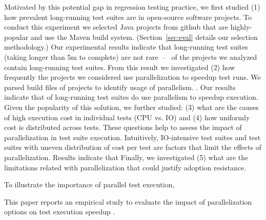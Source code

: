 Motivated by this potential gap in regression testing practice, we
first studied (1) how prevalent long-running test suites are in
open-source software projects.  To conduct this experiment we selected
\numSubjs{} Java projects from github that are highly-popular and use
the Maven build system.  (Section~\ref{sec:eval} details our selection
methodology.)  Our experimental results indicate that long-running
test suites (taking longer than 5m to complete) are not
rare~--~\numLongRunning{} of the projects we analyzed contain
long-running test suites.  From this result we investigated (2) how
frequently the projects we considered use parallelization to speedup
test runs.  We parsed build files of projects to identify usage of
parallelism. .  Our results indicate that
\percentParallelForLongRunning{} of long-running test suites do use
parallelism to speedup execution.  Given the popularity of this
solution, we further studied: (3) what are the causes of high
execution cost in individual tests (CPU vs. IO) and (4) how uniformly
cost is distributed across tests.  These questions help to assess the
impact of parallelization in test suite execution.  Intuitively,
IO-intensive test suites and test suites with uneven distribution of
cost per test are factors that limit the effects of parallelization.
Results indicate that   Finally, we investigated (5) what are
the limitations related with parallelization that could justify
adoption resistance.

\Fix{--------------}

To illustrate the importance of parallel test execution, 

This paper reports an empirical study to evaluate the impact of
parallelization options on test execution speedup  .

